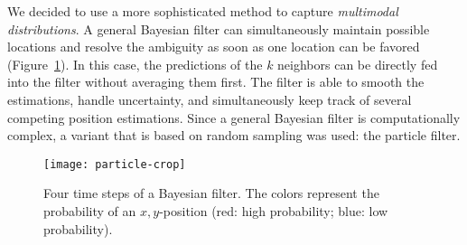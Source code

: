 We decided to use a more sophisticated method to capture
\emph{multimodal distributions}.  A general Bayesian filter can
simultaneously maintain possible locations and resolve the ambiguity
as soon as one location can be favored (Figure~\ref{fig:bayes}). In
this case, the predictions of the $k$ neighbors can be directly fed
into the filter without averaging them first. The filter is able to
smooth the estimations, handle uncertainty, and simultaneously keep
track of several competing position estimations. Since a general
Bayesian filter is computationally complex, a variant that is based on
random sampling was used: the particle filter.

\begin{figure}[t]
\begin{center}
\texttt{[image: particle-crop]}
\caption[Bayesian Filter.]{{\label{fig:bayes} Four time steps of a
    Bayesian filter. The colors represent the probability of an
    $x,y$-position (red: high probability; blue: low probability).}}
\end{center}
\end{figure}

